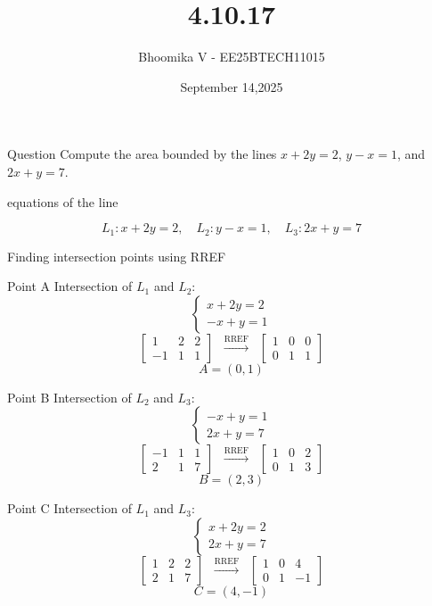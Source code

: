 \documentclass{beamer}
\begin{document}
\title 
{4.10.17}
\date{September 14,2025}


\author 
{Bhoomika V - EE25BTECH11015}




\frame{\titlepage}
\begin{frame}{Question}
Compute the area bounded by the lines $x + 2y = 2$, $y - x = 1$, and $2x + y = 7$.
\end{frame}

\begin{frame}{equations of the line}

\[
L_1: x + 2y = 2, \quad 
L_2: y - x = 1, \quad
L_3: 2x + y = 7
\]


 Finding intersection points using RREF \\
\end{frame}  

\begin{frame}{Point A}
Intersection of $L_1$ and $L_2$:
\[
\begin{cases}
x + 2y = 2 \\
-x + y = 1
\end{cases}
\]
\[
\left[\begin{array}{cc|c}
1 & 2 & 2 \\
-1 & 1 & 1
\end{array}\right]
\;\;\xrightarrow{\text{RREF}}\;\;
\left[\begin{array}{cc|c}
1 & 0 & 0 \\
0 & 1 & 1
\end{array}\right]
\]
\[
A= (0,1)
\]
\end{frame}

\begin{frame}{Point B}
Intersection of $L_2$ and $L_3$:
\[
\begin{cases}
-x + y = 1 \\
2x + y = 7
\end{cases}
\]
\[
\left[\begin{array}{cc|c}
-1 & 1 & 1 \\
2 & 1 & 7
\end{array}\right]
\;\;\xrightarrow{\text{RREF}}\;\;
\left[\begin{array}{cc|c}
1 & 0 & 2 \\
0 & 1 & 3
\end{array}\right]
\]
\[
B = (2,3)
\]
\end{frame}

\begin{frame}{Point C}
Intersection of $L_1$ and $L_3$:
\[
\begin{cases}
x + 2y = 2 \\
2x + y = 7
\end{cases}
\]
\[
\left[\begin{array}{cc|c}
1 & 2 & 2 \\
2 & 1 & 7
\end{array}\right]
\;\;\xrightarrow{\text{RREF}}\;\;
\left[\begin{array}{cc|c}
1 & 0 & 4 \\
0 & 1 & -1
\end{array}\right]
\]
\[
C = (4,-1)
\]
\end{frame}
\end{document}
